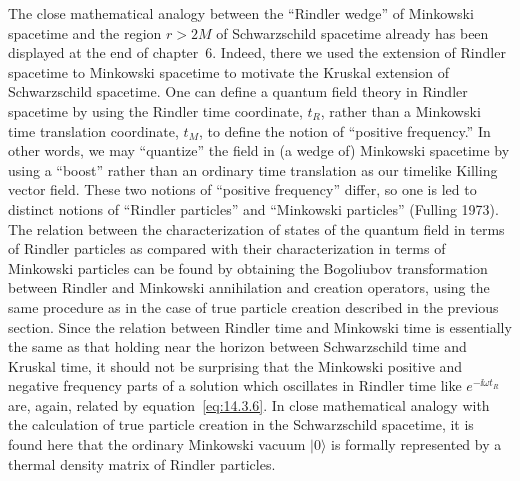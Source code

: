 The close mathematical analogy between the ``Rindler wedge'' of Minkowski
spacetime and the region \(r>2M\) of Schwarzschild spacetime already has been
displayed at the end of chapter~6. Indeed, there we used the extension of Rindler
spacetime to Minkowski spacetime to motivate the Kruskal extension of
Schwarzschild spacetime. One can define a quantum field theory in Rindler spacetime
by using the Rindler time coordinate, \(t_R\), rather than a Minkowski time
translation coordinate, \(t_M\), to define the notion of ``positive frequency.'' In
other words, we may ``quantize'' the field in (a wedge of) Minkowski spacetime by
using a ``boost'' rather than an ordinary time translation as our timelike Killing
vector field. These two notions of ``positive frequency'' differ, so one is led to
distinct notions of ``Rindler particles'' and ``Minkowski particles'' (Fulling 1973).
The relation between the characterization of states of the quantum field in terms of
Rindler particles as compared with their characterization in terms of Minkowski
particles can be found by obtaining the Bogoliubov transformation between Rindler
and Minkowski annihilation and creation operators, using the same procedure as in
the case of true particle creation described in the previous section. Since the relation
between Rindler time and Minkowski time is essentially the same as that holding near
the horizon between Schwarzschild time and Kruskal time, it should not be surprising
that the Minkowski positive and negative frequency parts of a solution which
oscillates in Rindler time like \(e^{-\ii\omega t_R}\) are, again, related by
equation~\eqref{eq:14.3.6}. In close mathematical analogy with the calculation of
true particle creation in the Schwarzschild spacetime, it is found here that the
ordinary Minkowski vacuum \(\lvert0\rangle\) is formally represented by a thermal
density matrix of Rindler particles.

